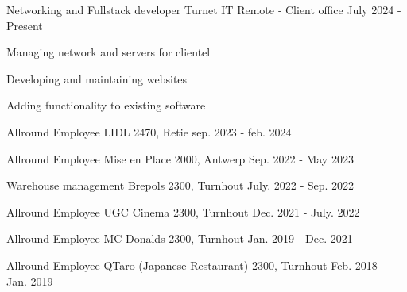 

\begin{cventries}

  \cventry
    {Networking and Fullstack developer} %
    {Turnet IT} %
    {Remote ‑ Client office} %
    {July 2024 - Present} %
    {
      \begin{cvitems} %
        \item {Managing network and servers for clientel}
        \item {Developing and maintaining websites}
        \item {Adding functionality to existing software}
      \end{cvitems}
    }

  \cventry
    {Allround Employee} %
    {LIDL} %
    {2470, Retie} %
    {sep. 2023 ‑ feb. 2024} %
    {
    }

\cventry
    {Allround Employee} %
    {Mise en Place} %
    {2000, Antwerp} %
    {Sep. 2022 ‑ May 2023} %
    {
    }

\cventry
    {Warehouse management} %
    {Brepols} %
    {2300, Turnhout} %
    {July. 2022 ‑ Sep. 2022} %
    {
    }

\cventry
    {Allround Employee} %
    {UGC Cinema} %
    {2300, Turnhout} %
    {Dec. 2021 ‑ July. 2022} %
    {
    }

\cventry
    {Allround Employee} %
    {MC Donalds} %
    {2300, Turnhout} %
    {Jan. 2019 ‑ Dec. 2021} %
    {
    }

\cventry
    {Allround Employee} %
    {QTaro (Japanese Restaurant)} %
    {2300, Turnhout} %
    {Feb. 2018 ‑ Jan. 2019} %
    {
    }

\end{cventries}
